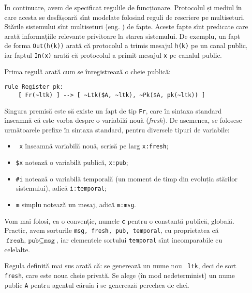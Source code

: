 În continuare, avem de specificat regulile de funcționare. Protocolul și mediul
în care acesta se desfășoară sînt modelate folosind reguli de rescriere pe
multiseturi. Stările sistemului sînt multiseturi (eng. ) de
fapte. Aceste fapte sînt predicate care arată informațiile relevante privitoare
la starea sistemului. De exemplu, un fapt de forma \texttt{Out(h(k))} arată
că protocolul a trimis mesajul \texttt{h(k)} pe un canal public, iar faptul
\texttt{In(x)} arată că protocolul a primit mesajul \texttt{x} pe canalul
public.\footnotemark


Prima regulă arată cum se înregistrează o cheie publică:

\begin{verbatim}
rule Register_pk:
    [ Fr(~ltk) ] --> [ ~Ltk($A, ~ltk), ~Pk($A, pk(~ltk)) ]
\end{verbatim}    

Singura premisă este să existe un fapt de tip \texttt{Fr}, care în sintaxa
standard înseamnă că este vorba despre o variabilă nouă (\emph{fresh}).
De asemenea, se folosesc următoarele prefixe în sintaxa standard, pentru
diversele tipuri de variabile:
\begin{itemize}
\item \texttt{~x} înseamnă variabilă nouă, scrisă pe larg \texttt{x:fresh};
\item \texttt{\$x} notează o variabilă publică, \texttt{x:pub};
\item \texttt{\#i} notează o variabilă temporală (un moment de timp din evoluția
  stărilor sistemului), adică \texttt{i:temporal};
\item \texttt{m} simplu notează un mesaj, adică \texttt{m:msg}.
\end{itemize}

Vom mai folosi, ca o convenție, numele \texttt{c} pentru o constantă publică,
globală. Practic, avem sorturile \texttt{msg, fresh, pub, temporal},
cu proprietatea că $ \texttt{fresh, pub} \subseteq \texttt{msg} $, iar elementele
sortului \texttt{temporal} sînt incomparabile cu celelalte.

Regula definită mai sus arată că: se generează un nume nou \texttt{~ltk}, deci
de sort \texttt{fresh}, care este noua cheie privată. Se alege (în mod nedeterminist)
un nume public \texttt{A} pentru agentul căruia i se generează perechea de chei.


